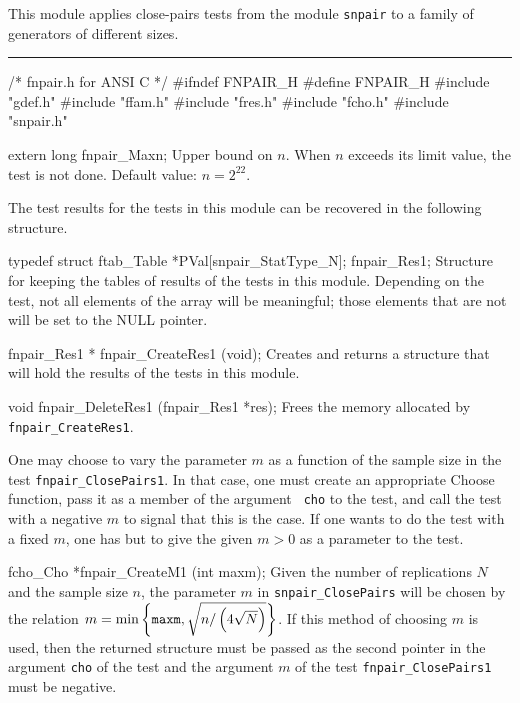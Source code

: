 
This module applies close-pairs tests from the module {\tt snpair}
to a family of generators of different sizes.

\bigskip
\hrule
\code\hide
/* fnpair.h  for ANSI C */
#ifndef FNPAIR_H
#define FNPAIR_H
\endhide
#include "gdef.h"
#include "ffam.h"
#include "fres.h"
#include "fcho.h"
#include "snpair.h"


extern long fnpair_Maxn;
\endcode
\tab
  Upper bound on $n$.
  When $n$ exceeds its limit value, the test is not done.
  Default value: $n = 2^{22}$.
\endtab
\ifdetailed  %



The test results for the tests in this module can be recovered
in the following structure.

\code

typedef struct {
   ftab_Table *PVal[snpair_StatType_N];
} fnpair_Res1;
\endcode
 \tab
  Structure for keeping the tables of results of the tests in
  this module. Depending on the test, not all elements of the array
  will be meaningful; those elements that are not will be set to
  the NULL pointer.
 \endtab
\code


fnpair_Res1 * fnpair_CreateRes1 (void);
\endcode
 \tab 
  Creates and returns a structure that will hold the results
  of the tests in this module. 
 \endtab
\code


void fnpair_DeleteRes1 (fnpair_Res1 *res);
\endcode
 \tab 
  Frees the memory allocated by {\tt fnpair\_CreateRes1}.
 \endtab

\fi    %



 One may choose to vary the parameter $m$ as a function of the sample size
in the test {\tt fnpair\_ClosePairs1}. In that case, one must create
 an appropriate Choose function, pass it as a member of the argument {\tt
cho} to the test,  and call the test with a negative $m$ to signal that
this is the case. If one wants to
 do the test with a fixed $m$, one has but to give the given $m> 0$ as a
parameter to the test.

\code


fcho_Cho *fnpair_CreateM1 (int maxm);
\endcode
 \tab 
  Given the number of replications $N$  and the sample
  size $n$, the parameter $m$ in {\tt snpair\_Close\-Pairs} will be chosen
  by the relation
   $m = \min\left\{{\tt maxm},\sqrt{{n}/\left(4\sqrt{N}\right)}\right\}$.
  If this method
  of choosing $m$ is used, then  the returned structure must be passed as
  the second pointer in the argument {\tt cho} of the test and the
  argument $m$ of the test  {\tt fnpair\_ClosePairs1} must be negative.
 \endtab
\code


